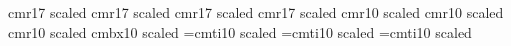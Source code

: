 
\newlength{\singlespace}
\setlength{\singlespace}{\baselineskip}
\newlength{\doublespace}
\setlength{\doublespace}{2.0\baselineskip}


\newcommand{\beq}{\begin{equation}}
\newcommand{\eeq}{\end{equation}}
\newcommand{\beqn}{\begin{eqnarray*}}
\newcommand{\eeqn}{\end{eqnarray*}}
\newcommand{\pr}{\partial}
\newcommand{\ovl}{\overline}

\newfont{\BBBigr} {cmr17 scaled}
\newfont{\BBbigr} {cmr17 scaled}
\newfont{\BBigr}  {cmr17 scaled}
\newfont{\Bbigr}  {cmr17 scaled}
\newfont{\Br}     {cmr10 scaled}
\newfont{\br}     {cmr10 scaled}
\newfont{\rr}      {cmr10 scaled}
\newfont{\Bigbf} {cmbx10 scaled}
\font\Bbigit=cmti10 scaled
\font\BBigit=cmti10 scaled
\font\Bigit=cmti10 scaled
 
\newcommand{\apl}{\aplett}  %
\newcommand{\aas}{\aaps}    %

